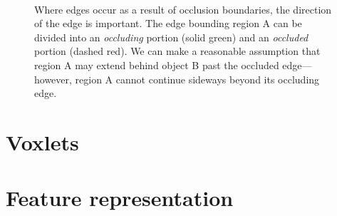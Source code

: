 \documentclass[10pt,twocolumn,letterpaper]{article}
\begin{document}
\begin{figure}
    \centering 
        \hfill
     \\
    \caption{Where edges occur as a result of occlusion boundaries, the direction of the edge is important. The edge bounding region A can be divided into an \emph{occluding} portion (solid green) and an \emph{occluded} portion (dashed red).
    We can make a reasonable assumption that region A may extend behind object B past the occluded edge---however, region A cannot continue sideways beyond its occluding edge.}
    \label{fig:occluded_region}
\end{figure}



\section{Voxlets}


\section{Feature representation}

\end{document}
